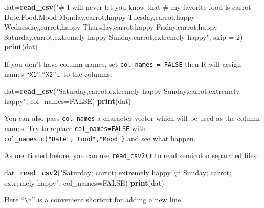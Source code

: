 \documentclass[12pt,]{krantz}
\makeatletter
\newenvironment{Shaded}{\begin{snugshade}}{\end{snugshade}}
\newcommand{\KeywordTok}[1]{\textcolor[rgb]{0.27,0.27,0.27}{\textbf{#1}}}
\newcommand{\DataTypeTok}[1]{\textcolor[rgb]{0.27,0.27,0.27}{#1}}
\newcommand{\DecValTok}[1]{\textcolor[rgb]{0.06,0.06,0.06}{#1}}
\newcommand{\CharTok}[1]{\textcolor[rgb]{0.5,0.5,0.5}{#1}}
\newcommand{\StringTok}[1]{\textcolor[rgb]{0.5,0.5,0.5}{#1}}
\newcommand{\OtherTok}[1]{\textcolor[rgb]{0.37,0.37,0.37}{#1}}
\newcommand{\NormalTok}[1]{#1}
\newenvironment{kframe}{%
\medskip{}
\setlength{\fboxsep}{.8em}
 \def\at@end@of@kframe{}%
 \ifinner\ifhmode%
  \def\at@end@of@kframe{\end{minipage}}%
  \begin{minipage}{\columnwidth}%
 \fi\fi%
 \def\FrameCommand##1{\hskip\@totalleftmargin \hskip-\fboxsep
 \colorbox{shadecolor}{##1}\hskip-\fboxsep
     \hskip-\linewidth \hskip-\@totalleftmargin \hskip\columnwidth}%
 \MakeFramed {\advance\hsize-\width
   \@totalleftmargin\z@ \linewidth\hsize
   \@setminipage}}%
 {\par\unskip\endMakeFramed%
 \at@end@of@kframe}
\renewenvironment{Shaded}{\begin{kframe}}{\end{kframe}}
\theoremstyle{definition}
\theoremstyle{definition}
\theoremstyle{definition}
\theoremstyle{remark}
\makeatother
\begin{document}
\begin{Shaded}
\begin{Highlighting}[]
\NormalTok{dat=}\KeywordTok{read_csv}\NormalTok{(}\StringTok{"# I will never let you know that}
\StringTok{          # my favorite food is carrot}
\StringTok{          Date,Food,Mood}
\StringTok{          Monday,carrot,happy}
\StringTok{          Tuesday,carrot,happy}
\StringTok{          Wednesday,carrot,happy}
\StringTok{          Thursday,carrot,happy}
\StringTok{          Friday,carrot,happy}
\StringTok{          Saturday,carrot,extremely happy}
\StringTok{          Sunday,carrot,extremely happy"}\NormalTok{, }\DataTypeTok{skip =} \DecValTok{2}\NormalTok{)}
\KeywordTok{print}\NormalTok{(dat)}
\end{Highlighting}
\end{Shaded}

If you don't have column names, set \texttt{col\_names\ =\ FALSE} then R
will assign names ``\texttt{X1}'',``\texttt{X2}''\ldots{} to the
columns:

\begin{Shaded}
\begin{Highlighting}[]
\NormalTok{dat=}\KeywordTok{read_csv}\NormalTok{(}\StringTok{"Saturday,carrot,extremely happy}
\StringTok{          Sunday,carrot,extremely happy"}\NormalTok{, }\DataTypeTok{col_names=}\OtherTok{FALSE}\NormalTok{)}
\KeywordTok{print}\NormalTok{(dat)}
\end{Highlighting}
\end{Shaded}

You can also pass \texttt{col\_names} a character vector which will be
used as the column names. Try to replace \texttt{col\_names=FALSE} with
\texttt{col\_names=c("Date","Food","Mood")} and see what happen.

As mentioned before, you can use \texttt{read\_csv2()} to read semicolon
separated files:

\begin{Shaded}
\begin{Highlighting}[]
\NormalTok{dat=}\KeywordTok{read_csv2}\NormalTok{(}\StringTok{"Saturday; carrot; extremely happy }\CharTok{\textbackslash{}n}\StringTok{ Sunday; carrot; extremely happy"}\NormalTok{, }\DataTypeTok{col_names=}\OtherTok{FALSE}\NormalTok{)}
\KeywordTok{print}\NormalTok{(dat)}
\end{Highlighting}
\end{Shaded}

Here ``\texttt{\textbackslash{}n}'' is a convenient shortcut for adding
a new line.
\end{document}

